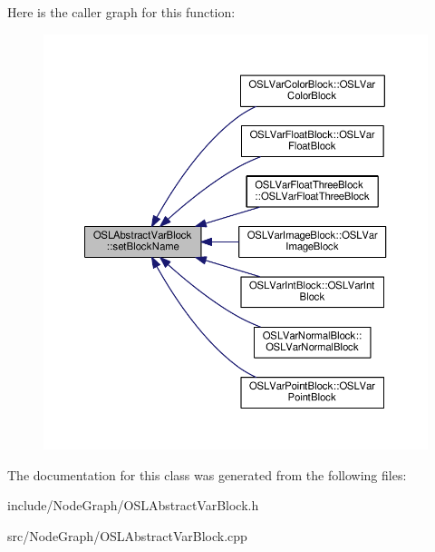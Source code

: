 Here is the caller graph for this function\-:
\nopagebreak
\begin{figure}[H]
\begin{center}
\leavevmode
\includegraphics[width=350pt]{class_o_s_l_abstract_var_block_a833548c33ea2a0eee22984507a3ffc24_icgraph}
\end{center}
\end{figure}




The documentation for this class was generated from the following files\-:\begin{DoxyCompactItemize}
\item 
include/\-Node\-Graph/O\-S\-L\-Abstract\-Var\-Block.\-h\item 
src/\-Node\-Graph/O\-S\-L\-Abstract\-Var\-Block.\-cpp\end{DoxyCompactItemize}
